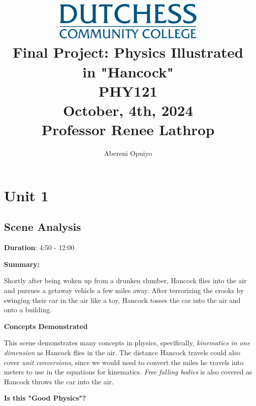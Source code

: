 \documentclass[a4paper,12pt]{article}
\title{
    \vspace{5cm} %
    \includegraphics[width=0.55\textwidth]{dutchess-logo-blue.png} \\ %
    \vspace{1cm} %
    \textbf{\Huge Final Project: Physics Illustrated in "Hancock"} \\
    \vspace{1cm} %
    \large PHY121 \\
    \vspace{0.5cm} %
    \large	October, 4th, 2024 \\ 
		\vspace{.5cm}
		\large Professor Renee Lathrop 
}
\author{Abereni Opuiyo}
\date{}
\begin{document}
\maketitle
	\thispagestyle{plain}
\newpage




\setcounter{secnumdepth}{0}
\setcounter{page}{1}  %
\tableofcontents
\thispagestyle{fancy}
\newpage

\section{Unit 1}

\vspace{-0.5cm}
\singlespacing

\subsection{Scene Analysis}

\textbf{Duration}: 4:50 - 12:00

\vspace{0.3cm}
\noindent\textbf{Summary:} \par
Shortly after being woken up from a drunken slumber, Hancock flies into the air and pursues a getaway vehicle a few miles away. After terrorizing the crooks by swinging their car in the air like a toy, Hancock tosses the car into the air and onto a building.
\par


\vspace{0.3cm}
\noindent\textbf{Concepts Demonstrated} \par
This scene demonstrates many concepts in physics, specifically, \emph{kinematics in one
	dimension} as Hancock flies in the air. The distance Hancock travels could
	also cover \emph{unit conversions}, since we would need to convert the miles
	he travels into meters to use in the equations for kinematics. \emph{Free falling bodies} is also covered as Hancock throws the car into the air.


\vspace{0.3cm}
\noindent\textbf{Is this "Good Physics"?} \par
\end{document}
